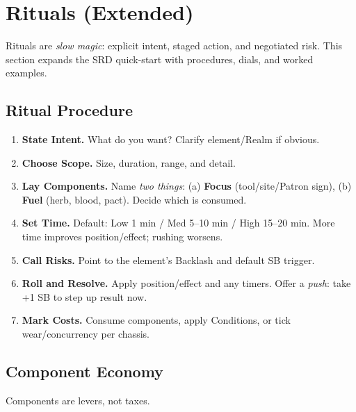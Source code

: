 \section{Rituals (Extended)}\label{sec:rituals_extended}

Rituals are \emph{slow magic}: explicit intent, staged action, and negotiated risk. This section expands the SRD quick-start with procedures, dials, and worked examples.

\subsection{Ritual Procedure}\label{subsec:ritual_procedure}
\begin{enumerate}[label=\textbf{Step \arabic*:}, leftmargin=2.2em]
    \item \textbf{State Intent.} What do you want? Clarify element/Realm if obvious.
    \item \textbf{Choose Scope.} Size, duration, range, and detail.
    \item \textbf{Lay Components.} Name \emph{two things}: (a) \textbf{Focus} (tool/site/Patron sign), (b) \textbf{Fuel} (herb, blood, pact). Decide which is consumed.
    \item \textbf{Set Time.} Default: Low 1 min / Med 5--10 min / High 15--20 min. More time improves position/effect; rushing worsens.
    \item \textbf{Call Risks.} Point to the element's Backlash and default SB trigger.
    \item \textbf{Roll and Resolve.} Apply position/effect and any timers. Offer a \emph{push}: take +1 SB to step up result now.
    \item \textbf{Mark Costs.} Consume components, apply Conditions, or tick wear/concurrency per chassis.
\end{enumerate}

\subsection{Component Economy}\label{subsec:component_economy}

Components are levers, not taxes.

